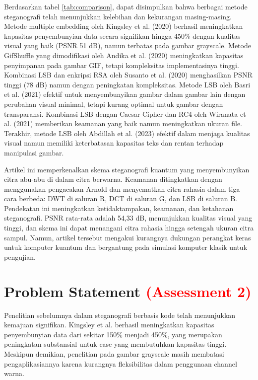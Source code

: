 \documentclass{ittelkom}
\begin{document}
Berdasarkan tabel \ref{tab:comparison}, dapat disimpulkan bahwa berbagai metode
steganografi telah menunjukkan kelebihan dan kekurangan masing-masing. Metode
multiple embedding oleh Kingsley et al. (2020) berhasil meningkatkan kapasitas
penyembunyian data secara signifikan hingga 450\% dengan kualitas visual yang
baik (PSNR 51 dB), namun terbatas pada gambar grayscale. Metode GifShuffle yang
dimodifikasi oleh Andika et al. (2020) meningkatkan kapasitas penyimpanan pada
gambar GIF, tetapi kompleksitas implementasinya tinggi. Kombinasi LSB dan
enkripsi RSA oleh Susanto et al. (2020) menghasilkan PSNR tinggi (78 dB) namun
dengan peningkatan kompleksitas. Metode LSB oleh Basri et al. (2021) efektif
untuk menyembunyikan gambar dalam gambar lain dengan perubahan visual minimal,
tetapi kurang optimal untuk gambar dengan transparansi. Kombinasi LSB dengan
Caesar Cipher dan RC4 oleh Wiranata et al. (2021) memberikan keamanan yang baik
namun meningkatkan ukuran file. Terakhir, metode LSB oleh Abdillah et al.
(2023) efektif dalam menjaga kualitas visual namun memiliki keterbatasan
kapasitas teks dan rentan terhadap manipulasi gambar.

Artikel ini memperkenalkan skema steganografi kuantum yang menyembunyikan citra
abu-abu di dalam citra berwarna. Keamanan ditingkatkan dengan menggunakan
pengacakan Arnold dan menyematkan citra rahasia dalam tiga cara berbeda: DWT di
saluran R, DCT di saluran G, dan LSB di saluran B. Pendekatan ini meningkatkan
ketidaktampakan, keamanan, dan ketahanan steganografi. PSNR rata-rata adalah
54,33 dB, menunjukkan kualitas visual yang tinggi, dan skema ini dapat
menangani citra rahasia hingga setengah ukuran citra sampul. Namun, artikel
tersebut mengakui kurangnya dukungan perangkat keras untuk komputer kuantum dan
bergantung pada simulasi komputer klasik untuk pengujian.\cite{dong2024new}

\section{Problem Statement \textcolor{red}{(Assessment 2)}} \label{request}

Penelitian sebelumnya dalam steganografi berbasis kode telah menunjukkan
kemajuan signifikan. Kingsley et al. \cite{kingsley2020improving} berhasil
meningkatkan kapasitas penyembunyian data dari sekitar 150\% menjadi 450\%,
yang merupakan peningkatan substansial untuk case yang membutuhkan kapasitas
tinggi. Meskipun demikian, penelitian pada gambar grayscale
\cite{soetarmono2012studi} masih membatasi pengaplikasiannya karena kurangnya
fleksibilitas dalam penggunaan channel warna.
\end{document}
